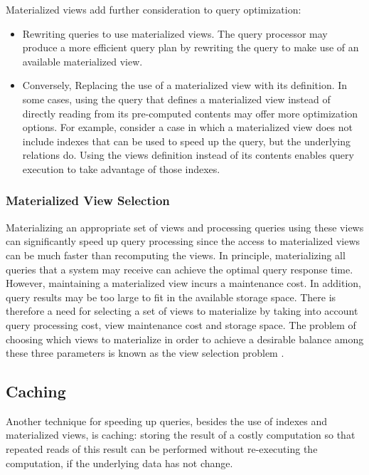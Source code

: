Materialized views add further consideration to query optimization:

\begin{itemize}

  \item Rewriting queries to use materialized views.
  The query processor may produce a more efficient query plan by rewriting the query to make use of an available
  materialized view.

  \item Conversely, Replacing the use of a materialized view with its definition.
  In some cases, using the query that defines a materialized view instead of directly reading from its pre-computed contents
  may offer more optimization options. \todo{}
  For example, consider a case in which a materialized view does not include indexes that can be used to speed up the query,
  but the underlying relations do.
  Using the views definition instead of its contents enables query execution to take advantage of those indexes.

\end{itemize}

\subsubsection{Materialized View Selection}

Materializing an appropriate set of views and processing queries using these views can significantly speed up
query processing since the access to materialized views can be much faster than recomputing the views.
In principle, materializing all queries that a system may receive can achieve the optimal query response time.
However, maintaining a materialized view incurs a maintenance cost.
In addition, query results may be too large to fit in the available storage space.
There is therefore a need for selecting a set of views to materialize by taking into account query processing cost,
view maintenance cost and storage space.
The problem of choosing which views to materialize in order to achieve a desirable balance among these three
parameters is known as the view selection problem \cite{gupta:viewselection, mami:viewselection}.

\subsection{Caching}
Another technique for speeding up queries, besides the use of indexes and materialized views, is caching:
storing the result of a costly computation so that repeated reads of this result can be performed without re-executing
the computation, if the underlying data has not change.

